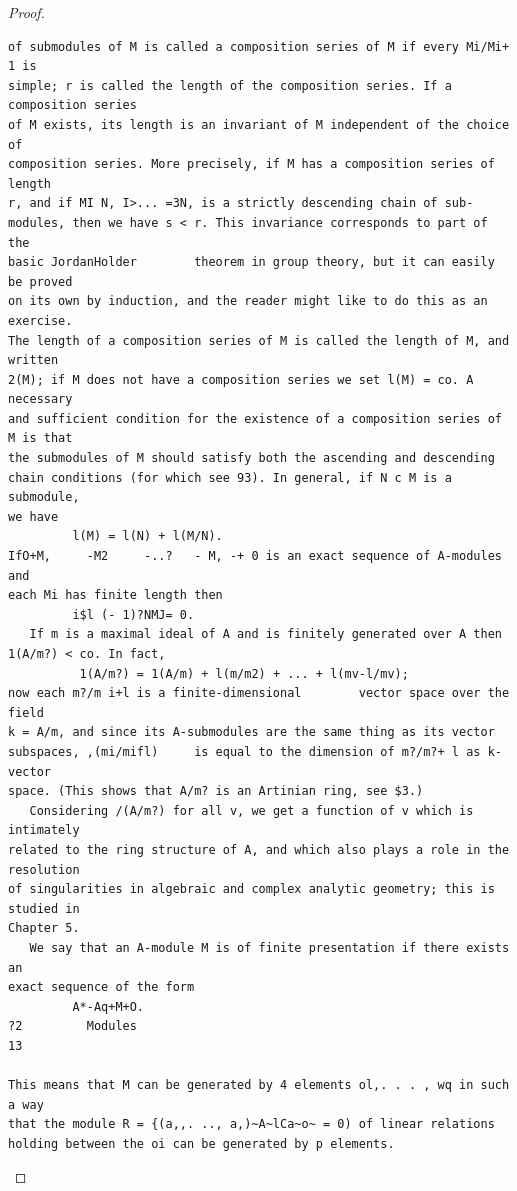 \begin{proof}
\begin{verbatim}
of submodules of M is called a composition series of M if every Mi/Mi+ 1 is
simple; r is called the length of the composition series. If a composition series
of M exists, its length is an invariant of M independent of the choice of
composition series. More precisely, if M has a composition series of length
r, and if MI N, I>... =3N, is a strictly descending chain of sub-
modules, then we have s < r. This invariance corresponds to part of the
basic JordanHolder        theorem in group theory, but it can easily be proved
on its own by induction, and the reader might like to do this as an exercise.
The length of a composition series of M is called the length of M, and written
2(M); if M does not have a composition series we set l(M) = co. A necessary
and sufficient condition for the existence of a composition series of M is that
the submodules of M should satisfy both the ascending and descending
chain conditions (for which see 93). In general, if N c M is a submodule,
we have
         l(M) = l(N) + l(M/N).
IfO+M,     -M2     -..?   - M, -+ 0 is an exact sequence of A-modules and
each Mi has finite length then
         i$l (- 1)?NMJ= 0.
   If m is a maximal ideal of A and is finitely generated over A then
1(A/m?) < co. In fact,
          1(A/m?) = 1(A/m) + l(m/m2) + ... + l(mv-l/mv);
now each m?/m i+l is a finite-dimensional        vector space over the field
k = A/m, and since its A-submodules are the same thing as its vector
subspaces, ,(mi/mifl)     is equal to the dimension of m?/m?+ l as k-vector
space. (This shows that A/m? is an Artinian ring, see $3.)
   Considering /(A/m?) for all v, we get a function of v which is intimately
related to the ring structure of A, and which also plays a role in the resolution
of singularities in algebraic and complex analytic geometry; this is studied in
Chapter 5.
   We say that an A-module M is of finite presentation if there exists an
exact sequence of the form
         A*-Aq+M+O.
?2         Modules                                                                  13

This means that M can be generated by 4 elements ol,. . . , wq in such a way
that the module R = {(a,,. .., a,)~A~lCa~o~ = 0) of linear relations
holding between the oi can be generated by p elements.
\end{verbatim}
\end{proof}


